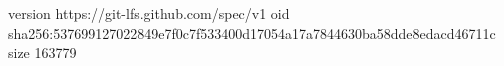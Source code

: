 version https://git-lfs.github.com/spec/v1
oid sha256:537699127022849e7f0c7f533400d17054a17a7844630ba58dde8edacd46711c
size 163779
